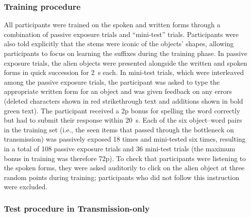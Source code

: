 \documentclass[doc,biblatex]{apa7}
\begin{document}
\subsubsection{Training procedure}

All participants were trained on the spoken and written forms through a combination of passive exposure trials and ``mini-test'' trials. Participants were also told explicitly that the stems were iconic of the objects' shapes, allowing participants to focus on learning the suffixes during the training phase. In passive exposure trials, the alien objects were presented alongside the written and spoken forms in quick succession for 2~s each. In mini-test trials, which were interleaved among the passive exposure trials, the participant was asked to type the appropriate written form for an object and was given feedback on any errors (deleted characters shown in red strikethrough text and additions shown in bold green text). The participant received a 2p bonus for spelling the word correctly but had to submit their response within 20~s. Each of the six object--word pairs in the training set (i.e., the seen items that passed through the bottleneck on transmission) was passively exposed 18 times and mini-tested six times, resulting in a total of 108 passive exposure trials and 36 mini-test trials (the maximum bonus in training was therefore 72p). To check that participants were listening to the spoken forms, they were asked auditorily to click on the alien object at three random points during training; participants who did not follow this instruction were excluded.

\subsubsection{Test procedure in Transmission-only}
\end{document}
